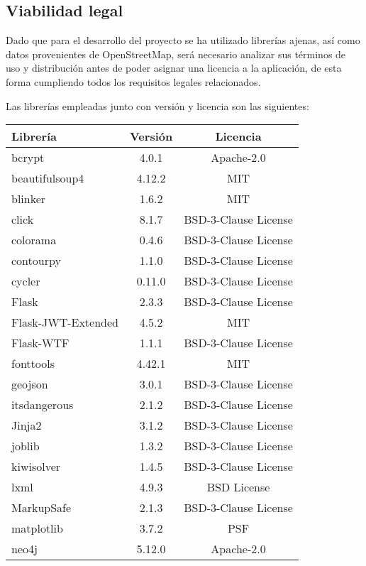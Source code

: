 \newpage
\subsection{Viabilidad legal}

Dado que para el desarrollo del proyecto se ha utilizado librerías ajenas, así como datos provenientes de OpenStreetMap, será necesario analizar sus términos de uso y distribución antes de poder asignar una licencia a la aplicación, de esta forma cumpliendo todos los requisitos legales relacionados.

Las librerías empleadas junto con versión y licencia son las siguientes:


\begin{table}[h!]
\centering
\begin{tabular}{|l|c|c|}
	\hline
\textbf{Librería} &\textbf{Versión} & \textbf{Licencia}\\ \hline
bcrypt & 4.0.1 & Apache-2.0\\
\hline
beautifulsoup4 & 4.12.2 & MIT \\
\hline
blinker & 1.6.2 & MIT\\
\hline
click & 8.1.7 & BSD-3-Clause License\\
\hline
colorama & 0.4.6 & BSD-3-Clause License\\
\hline
contourpy & 1.1.0 & BSD-3-Clause License\\
\hline
cycler & 0.11.0 & BSD-3-Clause License\\
\hline
Flask & 2.3.3 & BSD-3-Clause License \\
\hline
Flask-JWT-Extended & 4.5.2 & MIT\\
\hline
Flask-WTF & 1.1.1 & BSD-3-Clause License \\
\hline
fonttools & 4.42.1 & MIT\\
\hline
geojson & 3.0.1 & BSD-3-Clause License \\
\hline
itsdangerous & 2.1.2 & BSD-3-Clause License \\
\hline
Jinja2 & 3.1.2 & BSD-3-Clause License\\
\hline
joblib & 1.3.2 & BSD-3-Clause License\\
\hline
kiwisolver & 1.4.5 & BSD-3-Clause License\\
\hline
lxml & 4.9.3 & BSD License \\
\hline
MarkupSafe & 2.1.3 & BSD-3-Clause License \\
\hline
matplotlib & 3.7.2 & PSF\\
\hline
neo4j & 5.12.0 & Apache-2.0\\

\end{tabular}
\end{table}
